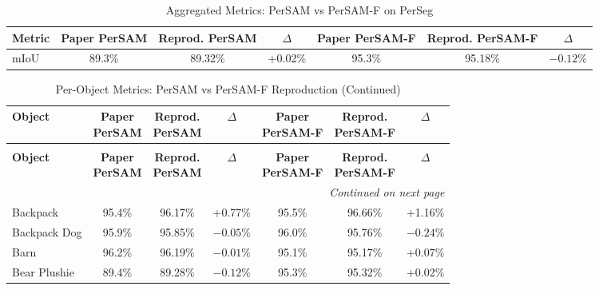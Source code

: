 \documentclass[journal,12pt,onecolumn,draftclsnofoot]{IEEEtran}
\begin{document}
\begin{table}[htbp]
\centering
\caption{Aggregated Metrics: PerSAM vs PerSAM-F on PerSeg}
\label{tab:persam_agg_reprod}
\begin{tabular}{l c c c c c c}
\toprule
\textbf{Metric} & \textbf{Paper PerSAM} & \textbf{Reprod. PerSAM} & \textbf{$\Delta$} & \textbf{Paper PerSAM-F} & \textbf{Reprod. PerSAM-F} & \textbf{$\Delta$} \\
\midrule
mIoU & 89.3\% & 89.32\% & +0.02\% & 95.3\% & 95.18\% & $-0.12\%$ \\
\bottomrule
\end{tabular}
\end{table}

\small
\setlength{\tabcolsep}{4pt}
\begin{longtable}{l c c c c c c}
\caption{Per-Object Metrics: PerSAM vs PerSAM-F Reproduction} \label{tab:persam_per_object} \\
\toprule
\textbf{Object} & \shortstack{\textbf{Paper} \\ \textbf{PerSAM}} & \shortstack{\textbf{Reprod.} \\ \textbf{PerSAM}} & \textbf{$\Delta$} & \shortstack{\textbf{Paper} \\ \textbf{PerSAM-F}} & \shortstack{\textbf{Reprod.} \\ \textbf{PerSAM-F}} & \textbf{$\Delta$} \\ \midrule
\endfirsthead
\caption[]{Per-Object Metrics: PerSAM vs PerSAM-F Reproduction (Continued)} \\
\toprule
\textbf{Object} & \shortstack{\textbf{Paper} \\ \textbf{PerSAM}} & \shortstack{\textbf{Reprod.} \\ \textbf{PerSAM}} & \textbf{$\Delta$} & \shortstack{\textbf{Paper} \\ \textbf{PerSAM-F}} & \shortstack{\textbf{Reprod.} \\ \textbf{PerSAM-F}} & \textbf{$\Delta$} \\ \midrule
\endhead
\midrule \multicolumn{7}{r}{\textit{Continued on next page}} \\
\endfoot
\bottomrule
\endlastfoot
Backpack & 95.4\% & 96.17\% & +0.77\% & 95.5\% & 96.66\% & +1.16\% \\
Backpack Dog & 95.9\% & 95.85\% & $-0.05\%$ & 96.0\% & 95.76\% & $-0.24\%$ \\
Barn & 96.2\% & 96.19\% & $-0.01\%$ & 95.1\% & 95.17\% & +0.07\% \\
Bear Plushie & 89.4\% & 89.28\% & $-0.12\%$ & 95.3\% & 95.32\% & +0.02\% \\

\end{longtable}
\end{document}
